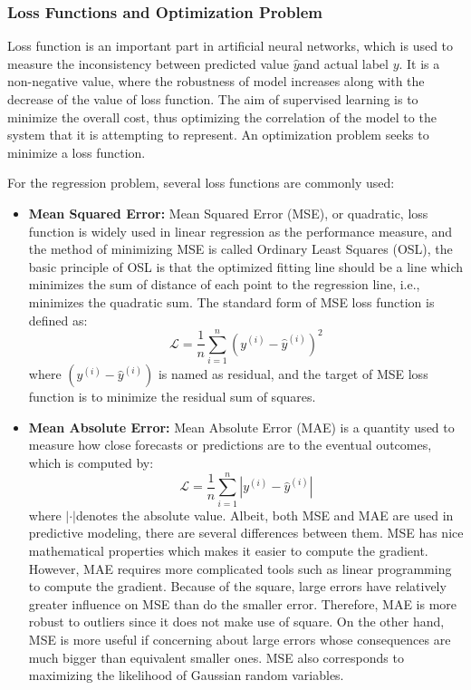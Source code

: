 \subsubsection*{Loss Functions and Optimization Problem}
Loss function is an important part in artificial neural networks, which is used to measure the inconsistency between predicted value  $ \hat{y} $and actual label $ y $. It is a non-negative value, where the robustness of model increases along with the decrease of the value of loss function. The aim of supervised learning is to minimize the overall cost, thus optimizing the correlation of the model to the system that it is attempting to represent. An optimization problem seeks to minimize a loss function. 

For the regression problem, several loss functions are commonly used:

\begin{itemize}
	\item \textbf{Mean Squared Error:} Mean Squared Error (MSE), or quadratic, loss function is widely used in linear regression as the performance measure, and the method of minimizing MSE is called Ordinary Least Squares (OSL), the basic principle of OSL is that the optimized fitting line should be a line which minimizes the sum of distance of each point to the regression line, i.e., minimizes the quadratic sum. The standard form of MSE loss function is defined as:
	\begin{equation}
		\mathcal{L}=\frac{ 1 }{n }\sum_{ i=1 }^{ n }{ (y^{ (i) } - \hat{y}^{ (i) } )^{2}}
	\end{equation}
	where $  (y^{ (i) } - \hat{y}^{ (i) } ) $ is named as residual, and the target of MSE loss function is to minimize the residual sum of squares.
	\item \textbf{Mean Absolute Error:} Mean Absolute Error (MAE) is a quantity used to measure how close forecasts or predictions are to the eventual outcomes, which is computed by:
	\begin{equation}
	\mathcal{L}=\frac{ 1 }{n }\sum_{ i=1 }^{ n }{ \left |  y^{ (i) } - \hat{y}^{ (i) } \right | }
	\end{equation}	
	where $ \left | \cdot \right | $denotes the absolute value. Albeit, both MSE and MAE are used in predictive modeling, there are several differences between them. MSE has nice mathematical properties which makes it easier to compute the gradient. However, MAE requires more complicated tools such as linear programming to compute the gradient. Because of the square, large errors have relatively greater influence on MSE than do the smaller error. Therefore, MAE is more robust to outliers since it does not make use of square. On the other hand, MSE is more useful if concerning about large errors whose consequences are much bigger than equivalent smaller ones. MSE also corresponds to maximizing the likelihood of Gaussian random variables.
\end{itemize}

